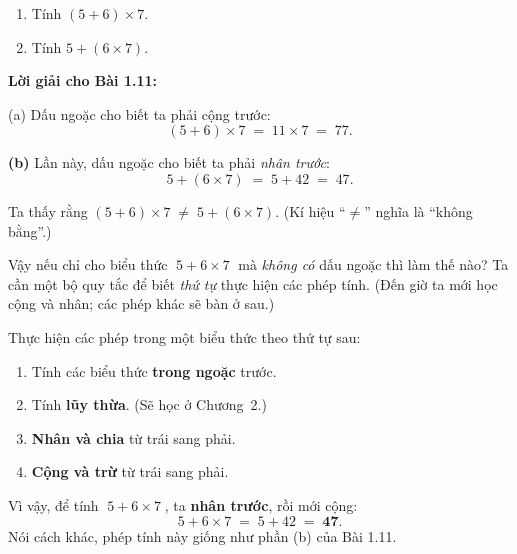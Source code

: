 \begin{problem}[1.11]
\begin{enumerate}[label=(\alph*)]
  \item Tính \((5+6)\times7\).
  \item Tính \(5+(6\times7)\).
\end{enumerate}
\end{problem}

\noindent\textbf{Lời giải cho Bài 1.11:}

\noindent(a)\; Dấu ngoặc cho biết ta phải cộng trước:
\[
(5+6)\times7 \;=\; 11\times7 \;=\; 77.
\]



\noindent\textbf{(b)} Lần này, dấu ngoặc cho biết ta phải \emph{nhân trước}:
\[
5 + (6\times7) \;=\; 5 + 42 \;=\; 47.
\]

Ta thấy rằng \((5+6)\times7 \;\neq\; 5 + (6\times7)\). (Kí hiệu “\(\neq\)”
nghĩa là “không bằng”.)

Vậy nếu chỉ cho biểu thức \(\;5 + 6\times7\;\) mà \emph{không có} dấu ngoặc
thì làm thế nào? Ta cần một bộ quy tắc để biết \emph{thứ tự} thực hiện các
phép tính. (Đến giờ ta mới học cộng và nhân; các phép khác sẽ bàn ở sau.)

\begin{tcolorbox}[colback=yellow!10, colframe=orange!80!black,
title={Quan trọng: Thứ tự thực hiện phép tính}]
Thực hiện các phép trong một biểu thức theo thứ tự sau:
\begin{enumerate}
  \item Tính các biểu thức \textbf{trong ngoặc} trước.
  \item Tính \textbf{lũy thừa}. (Sẽ học ở Chương~2.)
  \item \textbf{Nhân và chia} từ trái sang phải.
  \item \textbf{Cộng và trừ} từ trái sang phải.
\end{enumerate}
\end{tcolorbox}

Vì vậy, để tính \(\;5 + 6\times7\;\), ta \textbf{nhân trước}, rồi mới cộng:
\[
5 + 6\times7 \;=\; 5 + 42 \;=\; \mathbf{47}.
\]
Nói cách khác, phép tính này giống như phần (b) của Bài 1.11.


